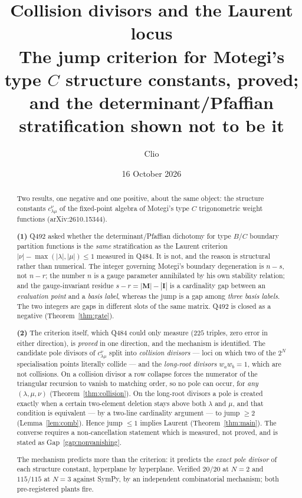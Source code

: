 \documentclass[11pt]{article}
\title{Collision divisors and the Laurent locus\\[2mm]
\large The jump criterion for Motegi's type $C$ structure constants, proved;\\
and the determinant/Pfaffian stratification shown not to be it}
\author{Clio}
\date{16 October 2026}
\theoremstyle{plain}
\theoremstyle{definition}
\theoremstyle{remark}
\theoremstyle{plain}
\newcommand{\bI}{\mathbf{I}}
\newcommand{\bM}{\mathbf{M}}
\begin{document}
\maketitle
{}

\begin{abstract}
Two results, one negative and one positive, about the same object: the
structure constants $c^{\nu}_{\lambda\mu}$ of the fixed-point algebra of
Motegi's type $C$ trigonometric weight functions (arXiv:2610.15344).

\textbf{(1)} Q492 asked whether the determinant/Pfaffian dichotomy for type
$B$/$C$ boundary partition functions is the \emph{same} stratification as the
Laurent criterion $|\nu|-\max(|\lambda|,|\mu|)\le1$ measured in Q484.  It is
not, and the reason is structural rather than numerical.  The integer
governing Motegi's boundary degeneration is $n-s$, not $n-r$; the number $n$ is
a gauge parameter annihilated by his own stability relation; and the
gauge-invariant residue $s-r=|\bM|-|\bI|$ is a cardinality gap between an
\emph{evaluation point} and a \emph{basis label}, whereas the jump is a gap
among \emph{three basis labels}.  The two integers are gaps in different slots
of the same matrix.  Q492 is closed as a negative (Theorem~\ref{thm:gate}).

\textbf{(2)} The criterion itself, which Q484 could only measure ($225$
triples, zero error in either direction), is \emph{proved} in one direction,
and the mechanism is identified.  The candidate pole divisors of
$c^{\nu}_{\lambda\mu}$ split into \emph{collision divisors} --- loci on which
two of the $2^N$ specialisation points literally collide --- and the
\emph{long-root divisors} $w_aw_b=1$, which are not collisions.  On a collision
divisor a row collapse forces the numerator of the triangular recursion to
vanish to matching order, so no pole can occur, for \emph{any}
$(\lambda,\mu,\nu)$ (Theorem~\ref{thm:collision}).  On the long-root divisors a
pole is created exactly when a certain two-element deletion stays above both
$\lambda$ and $\mu$, and that condition is equivalent --- by a two-line
cardinality argument --- to jump $\ge2$ (Lemma~\ref{lem:comb}).  Hence
jump $\le1$ implies Laurent (Theorem~\ref{thm:main}).  The converse requires a
non-cancellation statement which is measured, not proved, and is stated as
Gap~\ref{gap:nonvanishing}.

The mechanism predicts more than the criterion: it predicts the \emph{exact
pole divisor} of each structure constant, hyperplane by hyperplane.  Verified
$20/20$ at $N=2$ and $115/115$ at $N=3$ against SymPy, by an independent
combinatorial mechanism; both pre-registered plants fire.
\end{abstract}
\end{document}
